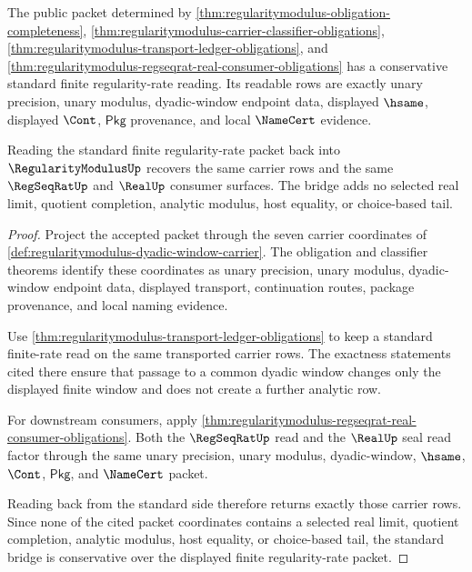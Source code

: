 \begin{theorem}
\label{thm:regularitymodulus-standard-rate-bridge}
The public packet determined by
\autoref{thm:regularitymodulus-obligation-completeness},
\autoref{thm:regularitymodulus-carrier-classifier-obligations},
\autoref{thm:regularitymodulus-transport-ledger-obligations}, and
\autoref{thm:regularitymodulus-regseqrat-real-consumer-obligations} has a
conservative standard finite regularity-rate reading. Its readable rows are
exactly unary precision, unary modulus, dyadic-window endpoint data, displayed
$\hsame$, displayed $\Cont$, $\mathsf{Pkg}$ provenance, and local
$\NameCert$ evidence.

Reading the standard finite regularity-rate packet back into
$\RegularityModulusUp$ recovers the same carrier rows and the same
$\RegSeqRatUp$ and $\RealUp$ consumer surfaces. The bridge adds no selected
real limit, quotient completion, analytic modulus, host equality, or
choice-based tail.
\end{theorem}
\begin{proof}
Project the accepted packet through the seven carrier coordinates of
\autoref{def:regularitymodulus-dyadic-window-carrier}. The obligation and
classifier theorems identify these coordinates as unary precision, unary
modulus, dyadic-window endpoint data, displayed transport, continuation
routes, package provenance, and local naming evidence.

Use \autoref{thm:regularitymodulus-transport-ledger-obligations} to keep a
standard finite-rate read on the same transported carrier rows. The exactness
statements cited there ensure that passage to a common dyadic window changes
only the displayed finite window and does not create a further analytic row.

For downstream consumers, apply
\autoref{thm:regularitymodulus-regseqrat-real-consumer-obligations}. Both the
$\RegSeqRatUp$ read and the $\RealUp$ seal read factor through the same unary
precision, unary modulus, dyadic-window, $\hsame$, $\Cont$, $\mathsf{Pkg}$,
and $\NameCert$ packet.

Reading back from the standard side therefore returns exactly those carrier
rows. Since none of the cited packet coordinates contains a selected real
limit, quotient completion, analytic modulus, host equality, or choice-based
tail, the standard bridge is conservative over the displayed finite
regularity-rate packet.
\end{proof}

